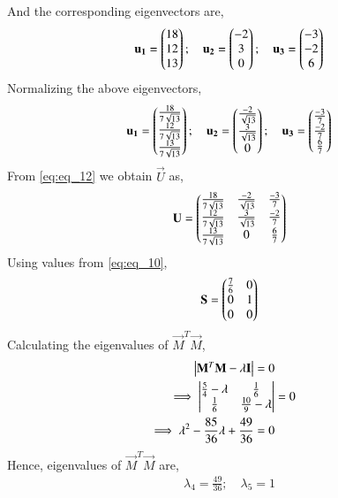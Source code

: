 \documentclass[journal,12pt,twocolumn]{IEEEtran}
\begin{document}
And the corresponding eigenvectors are,
\begin{align}
     \mathbf{u_1} = \begin{pmatrix}18 \\12 \\ 13\end{pmatrix}; \quad \mathbf{u_2} = \begin{pmatrix}-2 \\3 \\ 0\end{pmatrix};\quad 
    \mathbf{u_3} = \begin{pmatrix}-3 \\ -2 \\ 6\end{pmatrix}\label{eq:eq_11} 
\end{align}
Normalizing the above eigenvectors,
\begin{align} 
     \mathbf{u_1} = \begin{pmatrix}\tfrac{18}{7\sqrt{13}} \\\tfrac{12}{7\sqrt{13}}\\ \tfrac{13}{7\sqrt{13}}\end{pmatrix}; \quad 
    \mathbf{u_2} = \begin{pmatrix}\frac{-2}{\sqrt{13}} \\\frac{3}{\sqrt{13}} \\ 0\end{pmatrix}; \quad 
    \mathbf{u_3} = \begin{pmatrix}\tfrac{-3}{7} \\ \tfrac{-2}{7} \\ \tfrac{6}{7}\end{pmatrix}
  \label{eq:eq_12}
\end{align}
From \eqref{eq:eq_12} we obtain $\vec{U}$ as,
\begin{align} \label{eq:eq_13}
    \mathbf{U} = \begin{pmatrix}\tfrac{18}{7\sqrt{13}} & \frac{-2}{\sqrt{13}} &\tfrac{-3}{7} \\ \tfrac{12}{7\sqrt{13}} & \frac{3}{\sqrt{13}} & \tfrac{-2}{7}  \\  \tfrac{13}{7\sqrt{13}} & 0 & \tfrac{6}{7}\end{pmatrix}
\end{align}
Using values from \eqref{eq:eq_10},
\begin{align} \label{eq:eq_14}
    \mathbf{S} = \begin{pmatrix}\frac{7}{6} & 0 \\ 0 & 1 \\ 0 & 0\end{pmatrix} 
\end{align}
Calculating the eigenvalues of $\vec{M}^T\vec{M}$,
\begin{align}
    \begin{vmatrix}\mathbf{M}^T\mathbf{M} - \lambda \mathbf{I}\end{vmatrix} = 0 \nonumber \\
    \implies \begin{vmatrix}\tfrac{5}{4}-\lambda & \frac{1}{6} \\ \frac{1}{6} & \tfrac{10}{9}-\lambda\end{vmatrix} &= 0 \nonumber \\
    \implies \lambda^2 - \frac{85}{36}\lambda + \frac{49}{36} =0 \nonumber
\end{align}
Hence, eigenvalues of $\vec{M}^T\vec{M}$ are,
\begin{align}
    \lambda_4 = \frac{49}{36}; \quad \lambda_5 = 1 \nonumber
\end{align}
\end{document}
